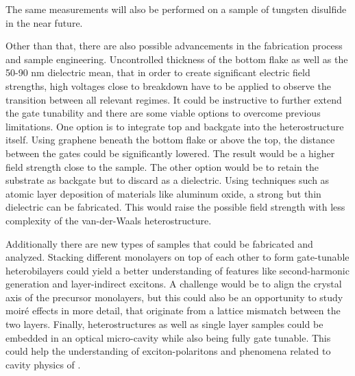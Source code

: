 The same measurements will also be performed on a sample of tungsten disulfide in the near future.

Other than that, there are also possible advancements in the fabrication process and sample engineering. Uncontrolled thickness of the bottom \hbng flake as well as the 50-90 nm \sio dielectric mean, that in order to create significant electric field strengths, high voltages close to breakdown have to be applied to observe the transition between all relevant regimes. It could be instructive to further extend the gate tunability and there are some viable options to overcome previous limitations. One option is to integrate top and backgate into the heterostructure itself. Using graphene beneath the bottom \hbng flake or above the top, the distance between the gates could be significantly lowered. The result would be a higher field strength close to the sample. The other option would be to retain the substrate as backgate but to discard \sio as a dielectric. Using techniques such as atomic layer deposition of materials like aluminum oxide, a strong but thin dielectric can be fabricated. This would raise the possible field strength with less complexity of the van-der-Waals heterostructure.

Additionally there are new types of samples that could be fabricated and analyzed. Stacking different \tmdg monolayers on top of each other to form gate-tunable heterobilayers could yield a better understanding of features like second-harmonic generation and layer-indirect excitons. A challenge would be to align the crystal axis of the precursor monolayers, but this could also be an opportunity to study moiré effects in more detail, that originate from a lattice mismatch between the two layers.
Finally, heterostructures as well as single layer samples could be embedded in an optical micro-cavity while also being fully gate tunable. This could help the understanding of exciton-polaritons and phenomena related to cavity physics of \tmds.